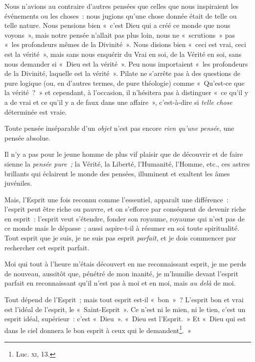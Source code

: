 \documentclass[french,twoside]{book} %
\begin{document}
Nous n’avions au contraire d’autres pensées que celles que nous inspiraient les événements ou les choses : nous jugions qu’une chose donnée était de telle ou telle nature. Nous pensions bien « c’est Dieu  qui a créé ce monde que nous voyons », mais notre pensée n’allait pas plus loin, nous ne « scrutions » pas « les profondeurs mêmes de la Divinité ». Nous disions bien « ceci est vrai, ceci est la vérité », mais sans nous enquérir du Vrai en soi, de la Vérité en soi, sans nous demander si « Dieu est la vérité ». Peu nous importaient « les profondeurs de la Divinité, laquelle est la vérité ». Pilate ne s’arrête pas à des questions de pure logique (ou, en d’autres termes, de pure théologie) comme « Qu’est-ce que la vérité ? » et cependant, à l’occasion, il n’hésitera pas à distinguer « ce qu’il y a de vrai et ce qu’il y a de faux dans une affaire », c’est-à-dire si \emph{telle chose} déterminée est vraie.\par
Toute pensée inséparable d’un \emph{objet} n’est pas encore \emph{rien qu’une pensée}, une pensée absolue.\par
Il n’y a pas pour le jeune homme de plus vif plaisir que de découvrir et de faire sienne la \emph{pensée pure ; }la Vérité, la Liberté, l’Humanité, l’Homme, etc., ces astres brillants qui éclairent le monde des pensées, illuminent et exaltent les âmes juvéniles.\par
Mais, l’Esprit une fois reconnu comme l’essentiel, apparaît une différence : l’esprit peut être riche ou pauvre, et on s’efforce par conséquent de devenir riche en esprit : l’esprit veut s’étendre, fonder son royaume, royaume qui n’est pas de ce monde mais le dépasse ; aussi aspire-t-il à résumer en soi toute spiritualité. Tout esprit que je suis, je ne suis pas esprit \emph{parfait,} et je dois commencer par rechercher cet esprit parfait.\par
Moi qui tout à l’heure m’étais découvert en me reconnaissant esprit, je me perds de nouveau, aussitôt que, pénétré de mon inanité, je m’humilie devant l’esprit parfait en reconnaissant qu’il n’est pas à moi et en moi, mais \emph{au delà} de moi.\par
Tout dépend de l’Esprit ; mais tout esprit est-il « bon » ? L’esprit bon et vrai est l’idéal de l’esprit, le « Saint-Esprit ». Ce n’est ni le mien, ni le tien, c’est un esprit idéal, supérieur : c’est « Dieu ». « Dieu est  l’Esprit. » Et « Dieu qui est dans le ciel donnera le bon esprit à ceux qui le demandent\footnote{ \noindent Luc. {\scshape xi}, 13.
 }. »\par
\end{document}
